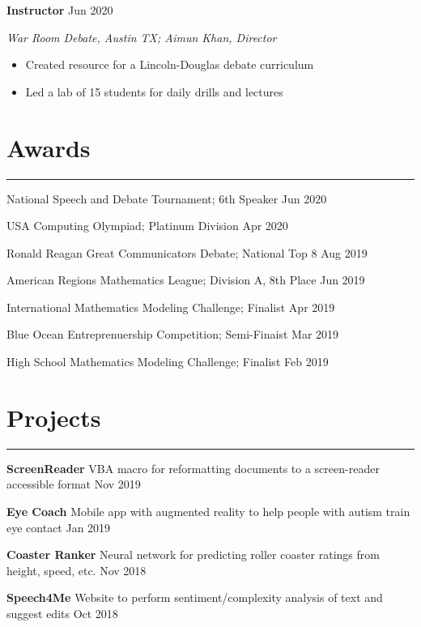 \documentclass[11pt]{article}
\newcommand{\resumesection}[1]{\vspace{-0.3cm}\section*{\color{highlight}#1}\vspace{-0.3cm}\hrule\vspace{0.3cm}}
\begin{document}
\textbf{Instructor}  \hfill Jun 2020 \par
\textit{War Room Debate, Austin TX; Aimun Khan, Director}
\begin{itemize}
	\item Created resource for a Lincoln-Douglas debate curriculum
	\item Led a lab of 15 students for daily drills and lectures
\end{itemize}

\resumesection{Awards}

National Speech and Debate Tournament; 6th Speaker \hfill Jun 2020 \par
USA Computing Olympiad; Platinum Division \hfill Apr 2020 \par
Ronald Reagan Great Communicators Debate; National Top 8 \hfill Aug 2019 \par
American Regions Mathematics League; Division A, 8th Place \hfill Jun 2019 \par
International Mathematics Modeling Challenge; Finalist \hfill Apr 2019\par
Blue Ocean Entreprenuership Competition; Semi-Finaist \hfill Mar 2019 \par
High School Mathematics Modeling Challenge; Finalist \hfill Feb 2019\par

\resumesection{Projects}

\textbf{ScreenReader} VBA macro for reformatting documents to a screen-reader accessible format \hfill Nov 2019 \par
\vspace{0.1cm}

\textbf{Eye Coach} Mobile app with augmented reality to help people with autism train eye contact \hfill Jan 2019 \par
\vspace{0.1cm}

\textbf{Coaster Ranker} Neural network for predicting roller coaster ratings from height, speed, etc.  \hfill Nov 2018\par
\vspace{0.1cm}

\textbf{Speech4Me} Website to perform sentiment/complexity analysis of text and suggest edits \hfill Oct 2018 \par
\vspace{0.1cm}
\end{document}
